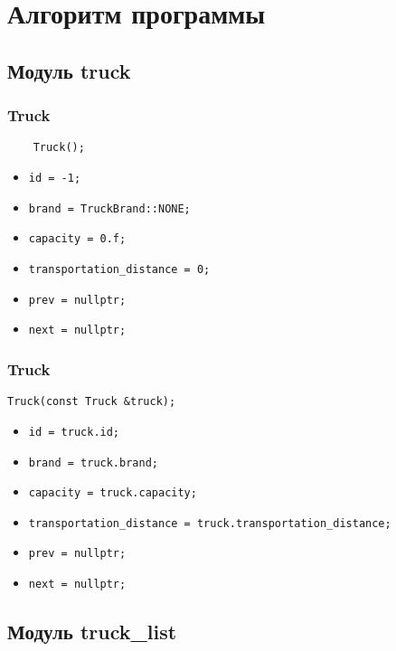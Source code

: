 \section*{Алгоритм программы}

\subsection*{Модуль truck}

\subsubsection*{Truck}

\begin{lstlisting}
	Truck();
\end{lstlisting}

\begin{itemize}
	\item \verb|id = -1;|
	\item \verb|brand = TruckBrand::NONE;|
	\item \verb|capacity = 0.f;|
	\item \verb|transportation_distance = 0;|
	\item \verb|prev = nullptr;|
	\item \verb|next = nullptr;|
\end{itemize}

\subsubsection*{Truck}

\begin{lstlisting}
Truck(const Truck &truck);
\end{lstlisting}

\begin{itemize}
	\item \verb|id = truck.id;|
	\item \verb|brand = truck.brand;|
	\item \verb|capacity = truck.capacity;|
	\item \verb|transportation_distance = truck.transportation_distance;|
	\item \verb|prev = nullptr;|
	\item \verb|next = nullptr;|
\end{itemize}

\subsection*{Модуль truck\_list}

